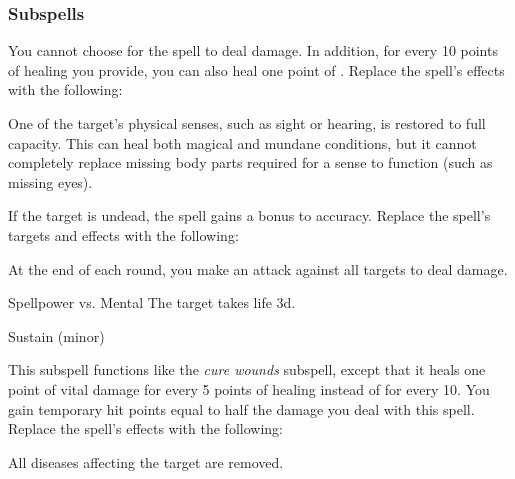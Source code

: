 \subsubsection{Subspells}
You cannot choose for the spell to deal damage.
In addition, for every 10 points of healing you provide, you can also heal one point of .
Replace the spell's effects with the following:
\begin{spellcontent}
\begin{augmenteffects}
\spelleffect
One of the target's physical senses, such as sight or hearing, is restored to full capacity.
This can heal both magical and mundane conditions, but it cannot completely replace missing body parts required for a sense to function (such as missing eyes).
\end{augmenteffects}
\end{spellcontent}
If the target is undead, the spell gains a  bonus to accuracy.
Replace the spell's targets and effects with the following:
\begin{spellcontent}
\begin{augmenttargetinginfo}
\end{augmenttargetinginfo}
\begin{augmenteffects}
\spelleffect
At the end of each round, you make an attack against all targets to deal damage.
\begin{spellattack}{Spellpower vs. Mental}
\spellsuccess
The target takes life  \minus3d.
\end{spellattack}
\spelldur Sustain (minor)
\end{augmenteffects}
\end{spellcontent}
This subspell functions like the \textit{cure wounds} subspell, except that it heals one point of vital damage for every 5 points of healing instead of for every 10.
You gain temporary hit points equal to half the damage you deal with this spell.
Replace the spell's effects with the following:
\begin{spellcontent}
\begin{augmenteffects}
\spelleffect
All diseases affecting the target are removed.
\end{augmenteffects}
\end{spellcontent}
